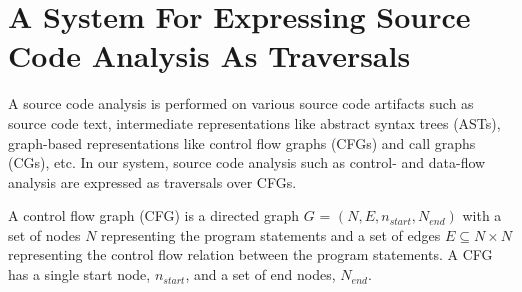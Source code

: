 \section{A System For Expressing Source Code Analysis As Traversals}
\label{sec:language}
A source code analysis is performed on various source code artifacts such as
source code text, intermediate representations like abstract syntax trees
(ASTs), graph-based representations like control flow graphs (CFGs) and call
graphs (CGs), etc. In our system, source code analysis such as control- and
data-flow analysis are expressed as traversals over CFGs.

\begin{definition}\label{def:cfg}
A control flow graph (CFG) is a directed graph $G$ = $(N, E, n_{start},
N_{end})$ with a set of nodes $N$ representing the program statements and a set
of edges $ E \subseteq N \times N$ representing the control flow relation
between the program statements. A CFG has a single start node, $n_{start}$, and
a set of end nodes, $N_{end}$.
\end{definition}

